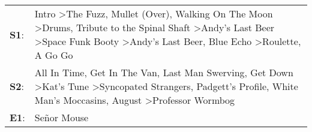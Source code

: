 \begin{supertabular}{p{0.03\textwidth}p{0.92\textwidth}}
 \textbf{S1}:  &  Intro\textsuperscript{} \textgreater \enspace The Fuzz\textsuperscript{}, \enspace Mullet (Over)\textsuperscript{}, \enspace Walking On The Moon\textsuperscript{} \textgreater \enspace Drums\textsuperscript{}, \enspace Tribute to the Spinal Shaft\textsuperscript{} \textgreater \enspace Andy's Last Beer\textsuperscript{} \textgreater \enspace Space Funk Booty\textsuperscript{} \textgreater \enspace Andy's Last Beer\textsuperscript{}, \enspace Blue Echo\textsuperscript{} \textgreater \enspace Roulette\textsuperscript{}, \enspace A Go Go\textsuperscript{}  \enspace  \\
 \textbf{S2}:  &                                                                                                        All In Time\textsuperscript{}, \enspace Get In The Van\textsuperscript{}, \enspace Last Man Swerving\textsuperscript{}, \enspace Get Down\textsuperscript{} \textgreater \enspace Kat's Tune\textsuperscript{} \textgreater \enspace Syncopated Strangers\textsuperscript{}, \enspace Padgett's Profile\textsuperscript{}, \enspace White Man's Moccasins\textsuperscript{}, \enspace August\textsuperscript{} \textgreater \enspace Professor Wormbog\textsuperscript{}  \enspace  \\
 \textbf{E1}:  &                                                                                                                                                                                                                                                                                                                                                                                                                                                                                                                                                   Señor Mouse\textsuperscript{}  \enspace  \\
\end{supertabular}
